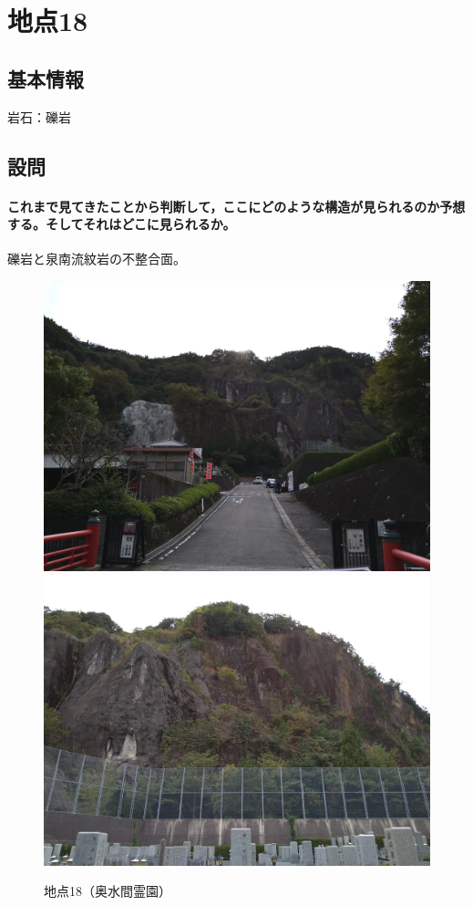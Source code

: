 \documentclass[uplatex,b5paper]{jsreport}
\begin{document}
  \section{地点18}
    \subsection{基本情報}
    岩石：礫岩
    \subsection{設問}
      \paragraph{これまで見てきたことから判断して，ここにどのような構造が見られるのか予想する。そしてそれはどこに見られるか。}
      礫岩と泉南流紋岩の不整合面。
  \begin{figure}[h]
    \begin{center}
      \includegraphics[scale=0.07]{files/地学実習/地点18.jpg}
      \includegraphics[scale=0.1]{files/地学実習/地点18_2.jpg}
      \caption{地点18（奥水間霊園）}
    \end{center}    
  \end{figure}
\end{document}
